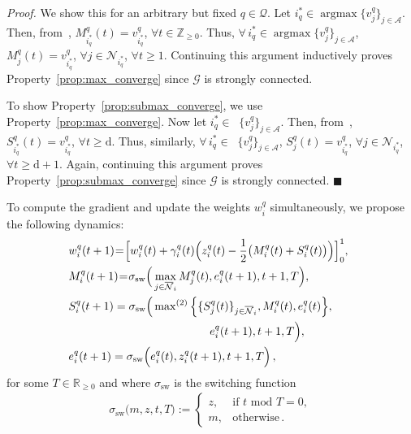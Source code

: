\documentclass{IEEEtran}
\newcommand{\ldef}{:=}
\newcommand{\Mcal}[1]{\mathcal{#1}}
\newcommand{\Mc}[1]{\mathcal{#1}}
\newcommand{\integer}{\ensuremath{\mathbb{Z}}}
\newcommand{\realnonnegative}{\ensuremath{\mathbb{R}}_{\ge 0}}
\newcommand{\squaresym}{\hbox{$\blacksquare$}}
\newcommand{\proofend}{\relax\ifmmode\else\unskip\hfill\fi\squaresym}
\renewenvironment{proof}{\textit{Proof.} }{\proofend}
\renewcommand{\bar}[1]{\overline{#1}}
\def \agt{\Mcal{A}}
\def \dg{\mathrm{d}}
\def \fseq{z}
\def \grph{\Mcal{G}}
\def \integer{\mathbb{Z}}
\def \intpos{\integer_{\geq 0}}
\def \neigh{\Mc{N}}
\def \neighb{\bar{\Mc{N}}}
\def \switch{\sigma_\mathrm{sw}}
\def \tsk{\Mc{Q}}
\DeclareMathOperator*{\submax}{max^{(2)}}
\DeclareMathOperator*{\argmax}{argmax}
\DeclareMathOperator*{\argsubmax}{argmax^{(2)}}
\renewcommand{\mod}{\,\,\mathrm{mod}\,\,}
\begin{document}
\begin{proof}
  We show this for an arbitrary but fixed $q \in \tsk$. Let
  $i^*_q \in \argmax \{v^q_j\}_{j \in \agt}$. Then,
  from~,
  $M^q_{i^*_q}(t) = v^q_{i^*_q}$, $\forall t \in \intpos$. Thus,
  $\forall \, i^*_q \in \argmax \{v^q_j\}_{j \in \agt}$,
  $M^q_j(t) = v^q_{i^*_q}$, $\forall j \in \neigh_{i^*_q}$,
  $\forall t \geq 1$. Continuing this argument inductively proves
  Property~\ref{prop:max_converge} since $\grph$ is strongly
  connected.

To show Property~\ref{prop:submax_converge}, we use Property~\ref{prop:max_converge}. Now let $i^*_q \in \argsubmax \{v^q_j\}_{j \in \agt}$. Then, from~, $S^q_{i^*_q}(t) = v^q_{i^*_q}$, $\forall t \geq \dg$. Thus, similarly, $\forall \, i^*_q \in \argsubmax \{v^q_j\}_{j \in \agt}$, $S^q_j(t) = v^q_{i^*_q}$, $\forall j \in \neigh_{i^*_q}$, $\forall t \geq \dg + 1$. Again, continuing this argument proves Property~\ref{prop:submax_converge} since $\grph$ is strongly connected.
\end{proof}

To compute the gradient and update the weights $w^q_i$ simultaneously, we propose the following dynamics:
\begin{subequations}
\begin{align}
  \label{eq:dist_wt_update} & \hspace{-1.0ex} w^q_i(t+1) \hspace{-0.5ex} = \hspace{-0.5ex} \Big[ w^q_i(t) + \gamma^q_i (t) \Big(\fseq^q_i(t) - \frac{1}{2} \big( M^q_i(t) + S^q_i(t) \big) \Big)   \Big]_0^1 , \\
  \label{eq:max_consensus} & \hspace{-1.0ex} M^q_i(t+1) \hspace{-0.5ex} = \hspace{-0.5ex} \switch \Big(\max_{j \in \neighb_i} M^q_j(t), e^q_i(t+1), t+1, T \Big),\\
  \notag & \hspace{-1.0ex} S^q_i(t+1) = \switch \Big(\submax \Big\{\{S^q_j(t)\}_{j \in \neighb_i},M^q_i(t),e^q_i(t) \Big\}, \\
  \label{eq:submax_consensus} & \hspace{12em} e^q_i(t+1), t+1, T \Big),\\
  \label{eq:input_injection} & \hspace{-1.0ex} e^q_i(t+1) = \switch \Big(e^q_i(t),z^q_i(t+1),t+1,T \Big)\,,
\end{align}
\label{eq:dist_pbrag}
\end{subequations}
for some $T \in \realnonnegative$ and where $\switch$ is the switching function
\begin{align}
	\switch \Big(m, \fseq,  t, T  \Big) \ldef 
	\begin{cases}
          \fseq, &\mathrm{if}\,\, t \mod T = 0,\\
          m, &\mathrm{otherwise}\,.
	\end{cases}
	\label{eq:switch}
\end{align}
\end{document}
